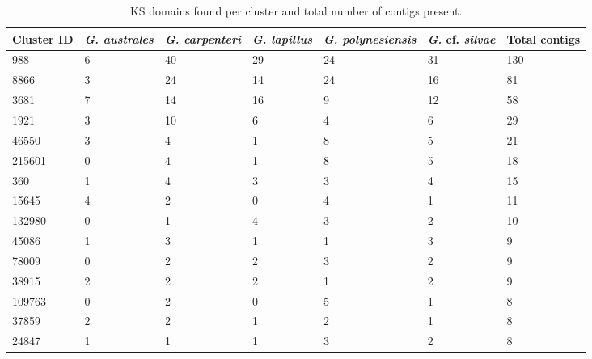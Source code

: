 \documentclass[12pt]{article}
\begin{document}
\FloatBarrier
\begin{longtable}{ | p{2cm} | p{2cm} |p{2.5cm} | p{2cm} | p{2.5cm} |  p{2cm} | p{2cm} |}
\caption{KS domains found per cluster and total number of contigs present.}\\
\hline
\label{tbl:KS}
\textbf{Cluster ID}&\textit{G. australes}&\emph{G. carpenteri}&\emph{G. lapillus}&\emph{G. polynesiensis}&\emph{G.} cf. \emph{silvae}&\textbf{Total contigs}\\
 \hline 
 988&6&40&29&24&31&130\\ %
 \hline 
8866&3&24&14&24&16&81\\ %
 \hline 
3681&7&14&16&9&12&58\\ %
 \hline 
1921&3&10&6&4&6&29\\ %
 \hline 
46550&3&4&1&8&5&21\\ %
 \hline 
215601&0&4&1&8&5&18\\ %
 \hline 
360&1&4&3&3&4&15\\ %
 \hline 
15645&4&2&0&4&1&11\\%
 \hline 
132980&0&1&4&3&2&10\\ %
 \hline 
45086&1&3&1&1&3&9\\ %
 \hline 
78009&0&2&2&3&2&9\\ %
 \hline 
38915&2&2&2&1&2&9\\ %
 \hline 
109763&0&2&0&5&1&8\\%
 \hline 
37859&2&2&1&2&1&8\\ %
 \hline 
24847&1&1&1&3&2&8\\ %

\end{longtable}
\end{document}
